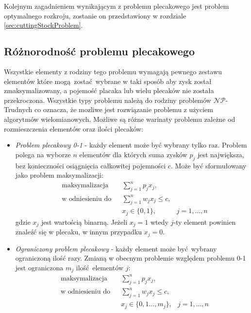 Kolejnym zagadnieniem wynikającym z problemu plecakowego jest problem optymalnego rozkroju, zostanie on przedstawiony w rozdziale \cref{sec:cuttingStockProblem}.
\subsection{Różnorodność problemu plecakowego}
Wszystkie elementy z rodziny tego problemu wymagają pewnego zestawu elementów które mogą zostać wybrane w taki sposób aby zysk został zmaksymalizowany, a pojemość placaka lub wielu plecaków nie została przekroczona. Wszystkie typy problemu należą do rodziny problemów $\mathcal{NP}$-Trudnych co oznacza, że mozliwe jest rozwiązanie problemu z użyciem algorytmów wielomianowych. Możliwe są różne warinaty problemu zależne od rozmieszczenia elementów oraz ilości plecaków\cite{PisingerThesis}:
\begin{itemize}
  \item \textit{Problem plecakowy 0-1} - każdy element może być wybrany tylko raz. Problem polega na wyborze $n$ elementów dla których suma zysków $p_j$ jest największa, bez konieczności osiągnięcia całkowitej pojemności $c$. Może być sformułowany jako problem maksymalizacji:
  \begin{equation}\label{01Knapsack}
    \begin{aligned}
      & \textrm{maksymalizacja} & & \sum_{j=1}^n p_jx_j, \\
      & \textrm{w odniesieniu do} & & \sum_{j=1}^n w_jx_j \le c, \\
      &&& x_j \in \{0,1\},& j = 1,\dots,n
    \end{aligned}
  \end{equation}
  gdzie $x_j$ jest wartością binarną. Jeżeli $x_j = 1$ wtedy $j$-ty element powinien znaleźć się w plecaku, w innym przypadku $x_j = 0$.
  \item \textit{Ograniczony problem plecakowy} - każdy element może być wybrany ograniczoną ilość razy. Zmianą w obecnym problemie względem problemu 0-1 jest ograniczona $m_j$ ilość elementów $j$:
  \begin{equation}\label{boundedKnapsack}
    \begin{aligned}
      & \textrm{maksymalizacja} & & \sum_{j=1}^n p_jx_j, \\
      & \textrm{w odniesieniu do} & & \sum_{j=1}^n w_jx_j \le c, \\
      &&& x_j \in \{0,1\dots,m_j\},& j = 1,\dots,n
    \end{aligned}
  \end{equation}

\end{itemize}
